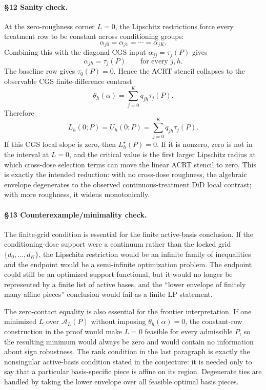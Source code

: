 \paragraph{\S12 Sanity check.}
At the zero-roughness corner \(L=0\), the Lipschitz restrictions force every
treatment row to be constant across conditioning groups:
\[
  \alpha_{j0}=\alpha_{j1}=\cdots=\alpha_{jK}.
\]
Combining this with the diagonal CGS input \(\alpha_{jj}=\tau_j(P)\) gives
\[
  \alpha_{j h}=\tau_j(P)\qquad\text{for every }j,h.
\]
The baseline row gives \(\tau_0(P)=0\).  Hence the ACRT stencil collapses to
the observable CGS finite-difference contrast
\[
  \theta_h(\alpha)
  =
  \sum_{j=0}^K q_{jh}\tau_j(P).
\]
Therefore
\[
  L_h(0;P)=U_h(0;P)=\sum_{j=0}^K q_{jh}\tau_j(P).
\]
If this CGS local slope is zero, then \(L_h^\star(P)=0\).  If it is nonzero,
zero is not in the interval at \(L=0\), and the critical value is the first
larger Lipschitz radius at which cross-dose selection terms can move the
linear ACRT stencil to zero.  This is exactly the intended reduction: with no
cross-dose roughness, the algebraic envelope degenerates to the observed
continuous-treatment DiD local contrast; with more roughness, it widens
monotonically.

\paragraph{\S13 Counterexample/minimality check.}
The finite-grid condition is essential for the finite active-basis conclusion.
If the conditioning-dose support were a continuum rather than the locked grid
\(\{d_0,\ldots,d_K\}\), the Lipschitz restriction would be an infinite family
of inequalities and the endpoint would be a semi-infinite optimization
problem.  The endpoint could still be an optimized support functional, but it
would no longer be represented by a finite list of active bases, and the
``lower envelope of finitely many affine pieces'' conclusion would fail as a
finite LP statement.

The zero-contact equality is also essential for the frontier interpretation.
If one minimized \(L\) over \(\mathcal A_L(P)\) without imposing
\(\theta_h(\alpha)=0\), the constant-row construction in the proof would make
\(L=0\) feasible for every admissible \(P\), so the resulting minimum would
always be zero and would contain no information about sign robustness.  The
rank condition in the last paragraph is exactly the nonsingular active-basis
condition stated in the conjecture: it is needed only to say that a particular
basis-specific piece is affine on its region.  Degenerate ties are handled by
taking the lower envelope over all feasible optimal basis pieces.
